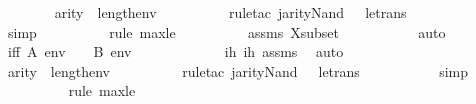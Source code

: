 \begin{isabellebody}
\ \ \ \ \ \ \isamarkupfalse%
\ {\isachardoublequoteopen}arity{\isacharparenleft}{\kern0pt}{\isasymphi}{\isacharparenright}{\kern0pt}\ {\isasymle}\ length{\isacharparenleft}{\kern0pt}env{\isacharparenright}{\kern0pt}{\isachardoublequoteclose}\ \isanewline
\ \ \ \ \ \ \ \ \isamarkupfalse%
{\isacharparenleft}{\kern0pt}rule{\isacharunderscore}{\kern0pt}tac\ j{\isacharequal}{\kern0pt}{\isachardoublequoteopen}arity{\isacharparenleft}{\kern0pt}Nand{\isacharparenleft}{\kern0pt}{\isasymphi}{\isacharcomma}{\kern0pt}\ {\isasympsi}{\isacharparenright}{\kern0pt}{\isacharparenright}{\kern0pt}{\isachardoublequoteclose}\ \ le{\isacharunderscore}{\kern0pt}trans{\isacharparenright}{\kern0pt}\isanewline
\ \ \ \ \ \ \ \ \ \isamarkupfalse%
\ simp\isanewline
\ \ \ \ \ \ \ \ \ \isamarkupfalse%
{\isacharparenleft}{\kern0pt}rule\ max{\isacharunderscore}{\kern0pt}le{}{\isacharparenright}{\kern0pt}\isanewline
\ \ \ \ \ \ \ \ \isamarkupfalse%
\ assms{}\ Xsubset\ \isanewline
\ \ \ \ \ \ \ \ \isamarkupfalse%
\ auto\isanewline
\ \ \ \ \ \ \isamarkupfalse%
\ \isamarkupfalse%
\ iff{}{\isacharcolon}{\kern0pt}\ {\isachardoublequoteopen}A{\isacharcomma}{\kern0pt}\ env\ {\isasymTurnstile}\ {\isasymphi}\ {\isasymlongleftrightarrow}\ B{\isacharcomma}{\kern0pt}\ env\ {\isasymTurnstile}\ {\isasymphi}{\isachardoublequoteclose}\ \isanewline
\ \ \ \ \ \ \ \ \isamarkupfalse%
\ ih{}\ ih{}\ assms{}\ \isamarkupfalse%
\ auto\isanewline
\isanewline
\ \ \ \ \ \ \isamarkupfalse%
\ {\isachardoublequoteopen}arity{\isacharparenleft}{\kern0pt}{\isasympsi}{\isacharparenright}{\kern0pt}\ {\isasymle}\ length{\isacharparenleft}{\kern0pt}env{\isacharparenright}{\kern0pt}{\isachardoublequoteclose}\ \isanewline
\ \ \ \ \ \ \ \ \isamarkupfalse%
{\isacharparenleft}{\kern0pt}rule{\isacharunderscore}{\kern0pt}tac\ j{\isacharequal}{\kern0pt}{\isachardoublequoteopen}arity{\isacharparenleft}{\kern0pt}Nand{\isacharparenleft}{\kern0pt}{\isasymphi}{\isacharcomma}{\kern0pt}\ {\isasympsi}{\isacharparenright}{\kern0pt}{\isacharparenright}{\kern0pt}{\isachardoublequoteclose}\ \ le{\isacharunderscore}{\kern0pt}trans{\isacharparenright}{\kern0pt}\isanewline
\ \ \ \ \ \ \ \ \ \isamarkupfalse%
\ simp\isanewline
\ \ \ \ \ \ \ \ \ \isamarkupfalse%
{\isacharparenleft}{\kern0pt}rule\ max{\isacharunderscore}{\kern0pt}le{}{\isacharparenright}{\kern0pt}\isanewline

\end{isabellebody}
